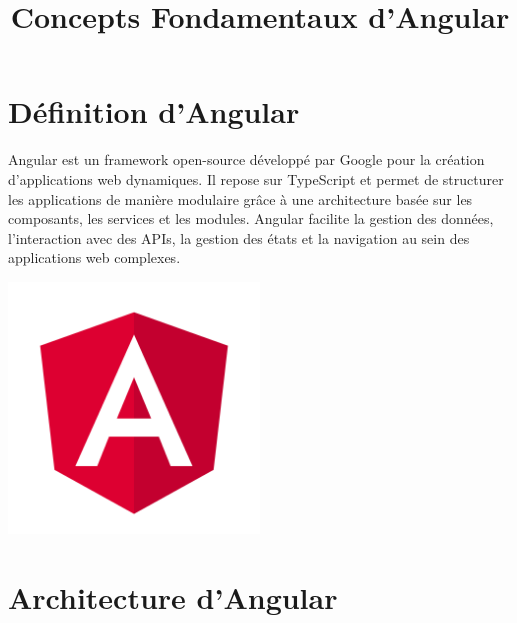 \documentclass{article}
\title{Concepts Fondamentaux d'Angular}
\author{}
\date{}
\begin{document}
\maketitle

\section*{Définition d'Angular}

Angular est un framework open-source développé par Google pour la création d'applications web dynamiques. Il repose sur TypeScript et permet de structurer les applications de manière modulaire grâce à une architecture basée sur les composants, les services et les modules. Angular facilite la gestion des données, l'interaction avec des APIs, la gestion des états et la navigation au sein des applications web complexes.


\begin{tcolorbox}[colframe=black!70, colback=white, title=Figure 1: Logo d'Angular, fonttitle=\bfseries]
\centering
\includegraphics[width=0.5\textwidth]{images/Angular_full_color_logo.svg.png}
\end{tcolorbox}


\section*{Architecture d'Angular}
\end{document}
